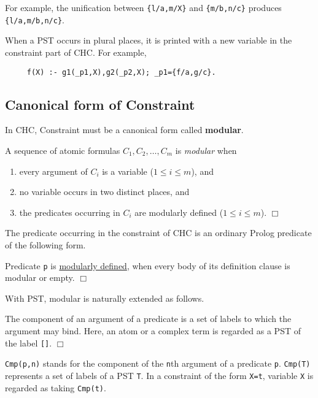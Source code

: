 For example, the unification between {\tt \{l/a,m/X\}} and 
{\tt \{m/b,n/c\}} produces {\tt \{l/a,m/b,n/c\}}.

When a PST occurs in plural places, it is printed with a new variable
in the constraint part of CHC. For example, 
\begin{verbatim}
     f(X) :- g1(_p1,X),g2(_p2,X); _p1={f/a,g/c}.
\end{verbatim}


\subsection{Canonical form of Constraint}
In CHC, Constraint must be a canonical form called {\bf modular}.

\begin{defs}[modular]
A sequence of atomic formulas $C_{1},C_{2},\ldots,C_{m}$ is {\em modular} 
when
\begin{enumerate}
 \item every argument of $C_{i}$ is a variable ($1 \leq i \leq m$), and
 \item no variable occurs in two distinct places, and 
 \item the predicates occurring in $C_{i}$ are modularly defined 
($1 \leq i \leq m$).	\hfill $\Box$
\end{enumerate}
\end{defs}

The predicate occurring in the constraint of CHC is an ordinary Prolog
predicate of the following form.

\begin{defs} 
Predicate {\tt p} is \underline{modularly defined}, when every body of
its definition clause is modular or empty. 	\hfill $\Box$
\end{defs}

With PST, modular is naturally extended as follows.

\begin{defs}[component]
The {\sf component} of an argument of a predicate is 
a set of labels to which the argument may bind.
Here, an atom or a complex term is regarded as a PST of the label
\verb![]!.	\hfill $\Box$
\end{defs}

{\tt Cmp(p,n)} stands for the component of the {\tt n}th 
argument of a predicate {\tt p}.
{\tt Cmp(T)} represents a set of labels of a PST {\tt T}.
In a constraint of the form {\tt X=t}, 
variable {\tt X} is regarded as taking {\tt Cmp(t)}.

